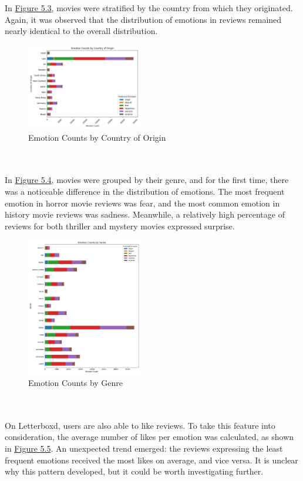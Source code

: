\documentclass[11pt]{article}
\begin{document}
\\ \\ In \hyperref[fig:emotion_counts_by_country]{Figure 5.3}, movies were stratified by the country from which they originated. Again, it was observed that the distribution of emotions in reviews remained nearly identical to the overall distribution.
\renewcommand{\thefigure}{5.3}
\begin{figure}[h]
	\centering
	\includegraphics[width=0.45\textwidth]{emotion_counts_by_country.png}
	\caption{Emotion Counts by Country of Origin}
	\label{fig:emotion_counts_by_country}
\end{figure}
\\ \\ In \hyperref[fig:emotion_counts_by_genre]{Figure 5.4}, movies were grouped by their genre, and for the first time, there was a noticeable difference in the distribution of emotions. The most frequent emotion in horror movie reviews was fear, and the most common emotion in history movie reviews was sadness. Meanwhile, a relatively high percentage of reviews for both thriller and mystery movies expressed surprise.
\renewcommand{\thefigure}{5.4}
\begin{figure}[h]
	\centering
	\includegraphics[width=0.45\textwidth]{emotion_counts_by_genre.png}
	\caption{Emotion Counts by Genre}
	\label{fig:emotion_counts_by_genre}
\end{figure}
\\ \\ On Letterboxd, users are also able to like reviews. To take this feature into consideration, the average number of likes per emotion was calculated, as shown in \hyperref[fig:average_likes_per_emotion]{Figure 5.5}. An unexpected trend emerged: the reviews expressing the least frequent emotions received the most likes on average, and vice versa. It is unclear why this pattern developed, but it could be worth investigating further.
\end{document}
